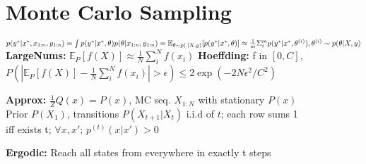 \begin{comment}
	\pagebreak
\end{comment}

\section{Monte Carlo Sampling}
$p(y^* | x^*, x_{1:n}, y_{1:n}) = \int p(y^* | x^*, \theta) p(\theta | x_{1:n}, y_{1:n}) = \\
\mathbb{E}_{\theta \sim p(.|X,y)}[p(y^*|x^*,\theta)]
\approx \frac{1}{m}\Sigma^m_i p(y^*|x^*,\theta^{(i)}), \theta^{(i)} \sim p(\theta|X,y)$\\
\textbf{LargeNums:} $\mathbb{E}_P[f(X)] \approx \frac{1}{N}\sum_i^N f(x_i)$ \textbf{Hoeffding:} f in $[0, C]$, 
$P(|\mathbb{E}_P[f(X)] - \frac{1}{N}\sum_i^N f(x_i)| > \epsilon) \leq 2 \exp(-2N\epsilon^2 / C^2)$\\
\begin{comment}
	\textbf{Intuition:} Based on the law of large numbers, we can derive the required number of samples N to be in a certain probability bound.\\
\end{comment}

\textbf{Approx:} $\frac{1}{Z}Q(x) = P(x)$, MC seq. $X_{1:N}$ with stationary $P(x)$\\
Prior $P(X_1)$, transitions $P(X_{t+1}|X_t)$ i.i.d of $t$; each row sums 1 \\
iff exists t; $\forall x, x'$; $p^{(t)}(x | x') > 0$
\\
\begin{comment}
	The Markov chain is a sequence of Random Variables, mostly the random variables are states in $\{1,..,M\}$.\\
	The MC is stationary if the transition probabilities are independent of t, e.g. they don't change if t changes.\\
\end{comment}

\textbf{Ergodic:} Reach all states from everywhere in exactly t steps\\
\begin{comment}
	\textbf{Note:} It must be exactly t steps to reach every state from everywhere. 
	\textbf{Example:} MC (1)-(2), whereas the state (2) can be reached from (1) after t=uneven steps, whereas it can be reached from (2) only after t=even steps.\\
\end{comment}

